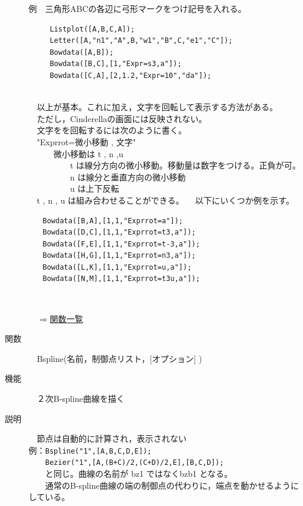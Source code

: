 \documentclass[papersize,a4paper,12pt,uplatex]{jsarticle}
\begin{document}
\begin{description}
例　三角形ABCの各辺に弓形マークをつけ記号を入れる。
\begin{verbatim}
　　　Listplot([A,B,C,A]);
　　　Letter([A,"n1","A",B,"w1","B",C,"e1","C"]);
　　　Bowdata([A,B]);
　　　Bowdata([B,C],[1,"Expr=s3,a"]);
　　　Bowdata([C,A],[2,1.2,"Expr=10","da"]);
\end{verbatim}
　　　\\

　以上が基本。これに加え，文字を回転して表示する方法がある。\\
　ただし，Cinderellaの画面には反映されない。\\
　文字をを回転するには次のように書く。\\
　"Exprrot=微小移動 , 文字"\\
　　　微小移動は t , n ,u \\
　　　　　t は線分方向の微小移動。移動量は数字をつける。正負が可。\\
　　　　　n は線分と垂直方向の微小移動\\
　　　　　u は上下反転\\
　t , n , u は組み合わせることができる。
　以下にいくつか例を示す。
\begin{verbatim}
　　Bowdata([B,A],[1,1,"Exprrot=a"]);
　　Bowdata([D,C],[1,1,"Exprrot=t3,a"]);
　　Bowdata([F,E],[1,1,"Exprrot=t-3,a"]);
　　Bowdata([H,G],[1,1,"Exprrot=n3,a"]);
　　Bowdata([L,K],[1,1,"Exprrot=u,a"]);
　　Bowdata([N,M],[1,1,"Exprrot=t3u,a"]);
\end{verbatim}
　\\


\begin{flushright}　\hyperlink{functionlist}{$\Rightarrow$関数一覧}\end{flushright}

\hypertarget{bspline}{}
\item[関数]　Bspline(名前，制御点リスト，[オプション] )
\item[機能]　２次B-spline曲線を描く
\item[説明]　節点は自動的に計算され，表示されない\\


例：\verb|Bspline("1",[A,B,C,D,E]);|\\
　　\verb|Bezier("1",[A,(B+C)/2,(C+D)/2,E],[B,C,D]);|\\
　　と同じ。曲線の名前が bz1 ではなくbzb1 となる。\\
　　通常のB-spline曲線の端の制御点の代わりに，端点を動かせるようにしている。\\
　　　　



\end{description}
\end{document}
